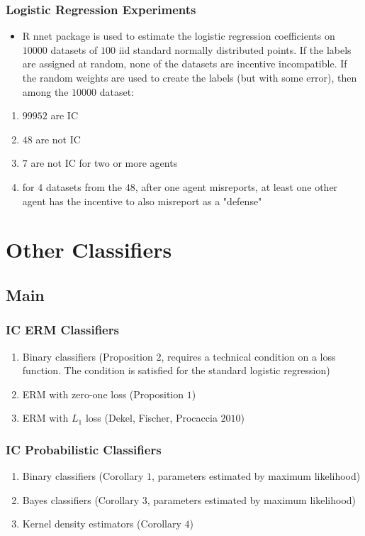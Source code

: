 \documentclass{beamer}
\begin{document}
\begin{frame} \frametitle{Logistic Regression Experiments}
\begin{itemize}
\item R nnet package is used to estimate the logistic regression coefficients on $10000$ datasets of $100$ iid standard normally distributed points. If the labels are assigned at random, none of the datasets are incentive incompatible. If the random weights are used to create the labels (but with some error), then among the $10000$ dataset:
\end{itemize}
\begin{enumerate}
\item $99952$ are IC
\item $48$ are not IC
\item $7$ are not IC for two or more agents
\item for $4$ datasets from the $48$, after one agent misreports, at least one other agent has the incentive to also misreport as a "defense"
\end{enumerate}

\end{frame}



\section{Other Classifiers} \subsection{Main}

\begin{frame} \frametitle{IC ERM Classifiers}
\begin{enumerate}
\item Binary classifiers (Proposition $2$, requires a technical condition on a loss function. The condition is satisfied for the standard logistic regression)
\item ERM with zero-one loss (Proposition $1$)
\item ERM with $L_{1}$ loss (Dekel, Fischer, Procaccia $2010$)
\end{enumerate}

\end{frame}

\begin{frame} \frametitle{IC Probabilistic Classifiers}
\begin{enumerate}
\item Binary classifiers (Corollary $1$, parameters estimated by maximum likelihood)
\item Bayes classifiers (Corollary $3$, parameters estimated by maximum likelihood)
\item Kernel density estimators (Corollary $4$)
\end{enumerate}

\end{frame}
\end{document}
